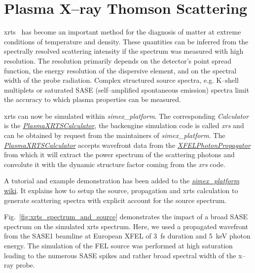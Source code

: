 \documentclass[10pt]{scrartcl}
\begin{document}
\section{Plasma X--ray Thomson Scattering\label{sec:xrts}}
%
\gls{xrts}~\cite{Glenzer2009,Fortmann2009d} has
become an important method for the diagnosis of matter at extreme conditions of
temperature and density. These quantities can be inferred from the spectrally
resolved scattering intensity if the spectrum was measured with high resolution.
The resolution primarily depends on the detector's point spread function, the
energy resolution of the dispersive element, and on the spectral width of
the probe radiation. Complex structured source spectra, e.g. K--shell multiplets
\cite{Lee2009a} or saturated SASE (self--amplified spontaneous emission) spectra
limit the accuracy to which plasma properties can be measured.

\gls{xrts} can now be simulated within \textit{simex\_platform}. The corresponding
\textit{Calculator} is the
\href{https://eucall-software.github.io/simex_platform/#SimEx.Calculators.PlasmaXRTSCalculator.PlasmaXRTSCalculator}{\textit{PlasmaXRTSCalculator}},
the backengine simulation code is called \textit{xrs} and can be obtained by
request from the maintainers of \textit{simex\_platform}. The
\href{https://eucall-software.github.io/simex_platform/#SimEx.Calculators.PlasmaXRTSCalculator.PlasmaXRTSCalculator}{\textit{PlasmaXRTSCalculator}}
accepts wavefront data from the
\href{https://eucall-software.github.io/simex_platform/#SimEx.Calculators.XFELPhotonPropagator.XFELPhotonPropagator}{\textit{XFELPhotonPropagator}}
from which it will extract the power spectrum of the scattering photons and
convolute it with the dynamic structure factor coming from the \textit{xrs}
code.

A tutorial and example demonstration has been added to the
\href{https://github.com/eucall-software/simex_platform/wiki/Tutorial_XRTS}{\textit{simex\_platform}
wiki}. It explains how to setup the source, propagation and \gls{xrts} calculation
to generate scattering spectra with explicit account for the source spectrum.

Fig.~\ref{fig:xrts_spectrum_and_source} demonstrates the impact of a broad SASE
spectrum on the simulated \gls{xrts} spectrum. Here, we used a propagated
wavefront from the SASE1 beamline at European XFEL of \SI{3}{\femto\second}
duration and \SI{5}{\kilo\electronvolt} photon energy. The simulation of the FEL
source was performed at high saturation leading to the numerous SASE spikes and
rather broad spectral width of the x--ray probe.
\end{document}
